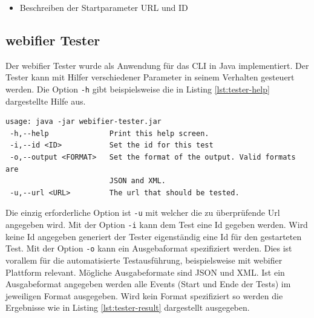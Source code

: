 \begin{itemize}
  \item Beschreiben der Startparameter URL und ID
\end{itemize}

\subsection{webifier Tester}

Der webifier Tester wurde als Anwendung für das \ac{CLI} in Java implementiert. Der Tester kann mit Hilfer verschiedener Parameter in seinem Verhalten gesteuert werden. Die Option \lstinline[style=eclipse]{-h} gibt beispielsweise die in Listing \ref{lst:tester-help} dargestellte Hilfe aus.

\begin{scriptsize}
\begin{lstlisting}
usage: java -jar webifier-tester.jar
 -h,--help              Print this help screen.
 -i,--id <ID>           Set the id for this test
 -o,--output <FORMAT>   Set the format of the output. Valid formats are
                        JSON and XML.
 -u,--url <URL>         The url that should be tested.
\end{lstlisting}
\end{scriptsize}

Die einzig erforderliche Option ist \lstinline[style=eclipse]{-u} mit welcher die zu überprüfende Url angegeben wird. Mit der Option \lstinline[style=eclipse]{-i} kann dem Test eine Id gegeben werden. Wird keine Id angegeben generiert der Tester eigenständig eine Id für den gestarteten Test. Mit der Option \lstinline[style=eclipse]{-o} kann ein Ausgebaformat spezifiziert werden. Dies ist vorallem für die automatisierte Testausführung, beispielsweise mit webifier Plattform relevant. Mögliche Ausgabeformate sind \ac{JSON} und \ac{XML}. Ist ein Ausgabeformat angegeben werden alle Events (Start und Ende der Tests) im jeweiligen Format ausgegeben. Wird kein Format spezifiziert so werden die Ergebnisse wie in Listing \ref{lst:tester-result} dargestellt ausgegeben.

